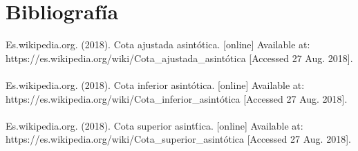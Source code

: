 \documentclass[12pt,twoside]{article}
\begin{document}
\section{Bibliograf\'ia}
Es.wikipedia.org. (2018). Cota ajustada asint\'otica. [online] Available at: https://es.wikipedia.org/wiki/Cota\_ajustada\_asint\'otica [Accessed 27 Aug. 2018].\\\\
Es.wikipedia.org. (2018). Cota inferior asint\'otica. [online] Available at: https://es.wikipedia.org/wiki/Cota\_inferior\_asint\'otica [Accessed 27 Aug. 2018].\\\\
Es.wikipedia.org. (2018). Cota superior asint\'tica. [online] Available at: https://es.wikipedia.org/wiki/Cota\_superior\_asint\'otica [Accessed 27 Aug. 2018].
\end{document}
